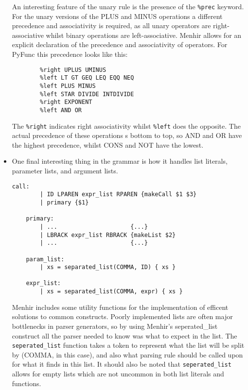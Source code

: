 \documentclass{l4proj}
\begin{document}
\begin{itemize}
    An interesting feature of the unary rule is the presence of the \texttt{\%prec} keyword.
    For the unary versions of the PLUS and MINUS operations a different precedence and associativity is required, as all unary operators are right-associative whilst binary operations are left-associative.
    Menhir allows for an explicit declaration of the precedence and associativity of operators.
    For PyFunc this precedence looks like this:
    \begin{lstlisting}[caption=PyFunc's Menhir precedence and associativity declarations.]
        %right CONS NOT
        %right UPLUS UMINUS
        %left LT GT GEQ LEQ EQQ NEQ
        %left PLUS MINUS
        %left STAR DIVIDE INTDIVIDE
        %right EXPONENT
        %left AND OR
    \end{lstlisting}
    The \texttt{\%right} indicates right associativity whilst \texttt{\%left} does the opposite.
    The actual precedence of these operations s bottom to top, so AND and OR have the highest precedence, whilst CONS and NOT have the lowest.

    \item 
    One final interesting thing in the grammar is how it handles list literals, parameter lists, and argument lists.
    \begin{lstlisting}[caption=PyFunc's Parser grammar for handling list literals.]
    call:
        | ID LPAREN expr_list RPAREN {makeCall $1 $3}
        | primary {$1}
    
    primary:
        | ...                     {...}
        | LBRACK expr_list RBRACK {makeList $2}
        | ...                     {...}

    param_list:
        | xs = separated_list(COMMA, ID) { xs }

    expr_list:
        | xs = separated_list(COMMA, expr) { xs }
    \end{lstlisting}

    Menhir includes some utility functions for the implementation of efficent solutions to common constructs.
    Poorly implemented lists are often major bottlenecks in parser generators, so by using Menhir's seperated\_list construct all the parser needed to know was what to expect in the list.
    The \texttt{seperated\_list} function takes a token to represent what the list will be split by (COMMA, in this case), and also what parsing rule should be called upon for what it finds in this list.
    It should also be noted that \texttt{seperated\_list} allows for empty lists which are not uncommon in both list literals and functions.

\end{itemize}
\end{document}
